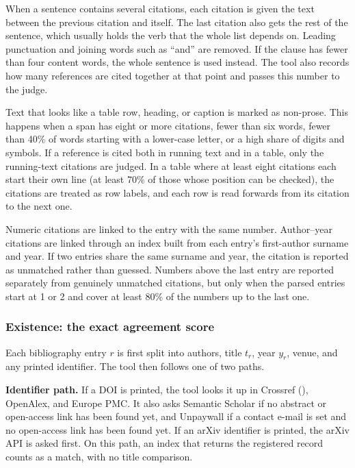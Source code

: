 \documentclass{article}
\newcommand{\vd}[1]{\texttt{\detokenize{#1}}}
\begin{document}
When a sentence contains several citations, each citation is given the text between the previous citation and itself. The last citation also gets the rest of the sentence, which usually holds the verb that the whole list depends on. Leading punctuation and joining words such as ``and'' are removed. If the clause has fewer than four content words, the whole sentence is used instead. The tool also records how many references are cited together at that point and passes this number to the judge.

Text that looks like a table row, heading, or caption is marked as non-prose. This happens when a span has eight or more citations, fewer than six words, fewer than 40\% of words starting with a lower-case letter, or a high share of digits and symbols. If a reference is cited both in running text and in a table, only the running-text citations are judged. In a table where at least eight citations each start their own line (at least 70\% of those whose position can be checked), the citations are treated as row labels, and each row is read forwards from its citation to the next one.

Numeric citations are linked to the entry with the same number. Author--year citations are linked through an index built from each entry's first-author surname and year. If two entries share the same surname and year, the citation is reported as unmatched rather than guessed. Numbers above the last entry are reported separately from genuinely unmatched citations, but only when the parsed entries start at 1 or 2 and cover at least 80\% of the numbers up to the last one.

\subsubsection{Existence: the exact agreement score}
\label{sec:sigma}

Each bibliography entry $r$ is first split into authors, title $t_r$, year $y_r$, venue, and any printed identifier. The tool then follows one of two paths.

\textbf{Identifier path.} If a DOI is printed, the tool looks it up in Crossref (\vd{/works/{doi}}), OpenAlex, and Europe PMC. It also asks Semantic Scholar if no abstract or open-access link has been found yet, and Unpaywall if a contact e-mail is set and no open-access link has been found yet. If an arXiv identifier is printed, the arXiv API is asked first. On this path, an index that returns the registered record counts as a match, with no title comparison.
\end{document}
